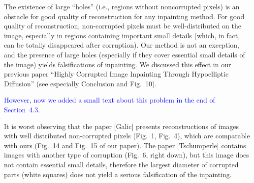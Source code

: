 \documentclass{amsart}
\begin{document}
\medskip 

The existence of large ``holes'' (i.e., regions without noncorrupted pixels) is an obstacle for 
good quality of reconstruction for any inpainting method. For good quality of reconstruction, 
non-corrupted pixels must be well-distributed on the image, especially in regions containing 
important small details (which, in fact, can be totally disappeared after corruption). 
Our method is not an exception, and the presence of large holes (especially if they cover essential small details of the image) yields falsifications of inpainting. 
We discussed this effect in our previous paper ``Highly Corrupted Image Inpainting Through Hypoelliptic Diffusion'' (see especially Conclusion and Fig.~10).

\textcolor{blue}{
However, now we added a small text about this problem in the end of Section~4.3.
}

It is worst observing that the paper [Galic] presents reconstructions of images with well distributed 
non-corrupted pixels (Fig.~1, Fig.~4), which are comparable with ours (Fig.~14 and Fig.~15 of our paper). 
The paper [Tschumperle] contains images with another type of corruption (Fig.~6, right down), but this image 
does not contain essential small details, therefore the largest diameter of corrupted parts (white squares) 
does not yield a serious falsification of the inpainting. 
\end{document}
